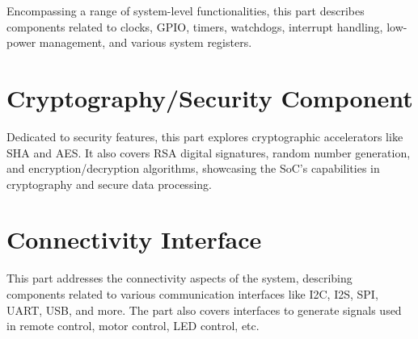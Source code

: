 \documentclass[openany, 10pt]{book}
\begin{document}

Encompassing a range of system-level functionalities, this part describes components related to clocks, GPIO, timers, watchdogs, interrupt handling, low-power management, and various system registers.



\part{Cryptography/Security Component}

Dedicated to security features, this part explores cryptographic accelerators like SHA and AES. It also covers RSA digital signatures, random number generation, and encryption/decryption algorithms, showcasing the SoC's capabilities in cryptography and secure data processing.




\part{Connectivity Interface}


This part addresses the connectivity aspects of the system, describing components related to various communication interfaces like I2C, I2S, SPI, UART, USB, and more. The part also covers interfaces to generate signals used in remote control, motor control, LED control, etc.

\end{document}
